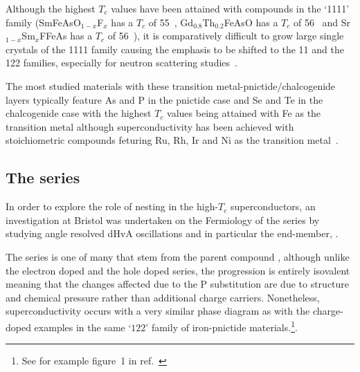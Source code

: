 Although the highest $T_c$ values have been attained with compounds in the `1111' family (SmFeAsO$_{1-x}$F$_x$ has a $T_c$ of \unit{55}{\kelvin}~\cite{Ren2008}, Gd$_0.8$Th$_{0.2}$FeAsO has a $T_c$ of \unit{56}{\kelvin}~\cite{Wang2008} and Sr$_{1-x}$Sm$_x$FFeAs has a $T_c$ of \unit{56}{\kelvin}~\cite{Wu2009}), it is comparatively difficult to grow large single crystals of the 1111 family causing the emphasis to be shifted to the 11 and the 122 families, especially for neutron scattering studies~\cite{Johnston2010}.

The most studied materials with these transition metal-pnictide/chalcogenide layers typically feature As and P in the pnictide case and Se and Te in the chalcogenide case with the highest $T_c$ values being attained with Fe as the transition metal although superconductivity has been achieved with stoichiometric compounds feturing Ru, Rh, Ir and Ni as the transition metal~\cite{Johnston2010}.

\subsection{The \BaFePAs series}

In order to explore the role of nesting in the high-$T_c$ superconductors, an investigation at Bristol was undertaken on the Fermiology of the \BaFePAs series by studying angle resolved \ac{dHvA} oscillations and in particular the end-member, \BaFeP.

The \BaFePAs series is one of many that stem from the parent compound \BaFeAs, although unlike the electron doped \BaCoFeAs and the hole doped \BaKFeAs series, the \BaFePAs progression is entirely isovalent meaning that the changes affected due to the P substitution are due to structure and chemical pressure rather than additional charge carriers. Nonetheless, superconductivity occurs with a very similar phase diagram as with the charge-doped examples in the same `$122$' family of iron-pnictide materials.\footnote{See for example figure~1 in ref.~\cite{Paglione2010}}. 


